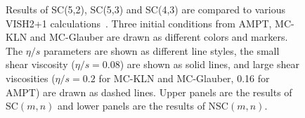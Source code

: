 \documentclass[ALICE,manyauthors]{cernphprep}
\begin{document}
\begin{figure}[p]
\begin{center}
        \caption{Results of  SC(5,2), SC(5,3) and SC(4,3) are compared to various VISH2+1 calculations~\cite{Zhu:2016puf}. Three initial conditions from AMPT, MC-KLN and MC-Glauber are drawn as different colors and markers. The $\eta/s$ parameters are shown as different line styles, the small shear viscosity ($\eta/s=0.08$) are shown as solid lines, and large shear viscosities ($\eta/s=0.2$ for MC-KLN and MC-Glauber, 0.16 for AMPT) are drawn as dashed lines. Upper panels are the results of SC$(m,n)$ and lower panels are the results of NSC$(m,n)$.}
        \label{fig:Figure_6}
        \end{center}   
 \end{figure}
 
\end{document}
